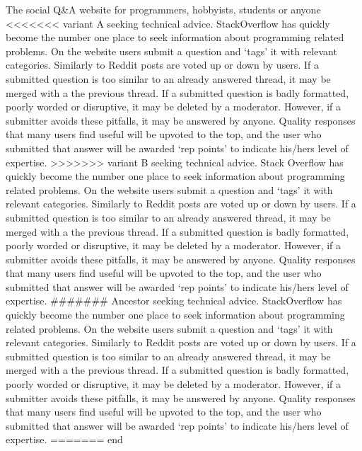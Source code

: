 \documentclass[a4paper,11pt]{article} %
\begin{document}
The social Q\&A website for programmers, hobbyists, students or anyone
<<<<<<< variant A
seeking technical advice. StackOverflow has quickly become the number one
place to seek information about programming related problems. On the website
users submit a question and ‘tags’ it with relevant categories.  Similarly
to Reddit posts are voted up or down by users. If a submitted question is
too similar to an already answered thread, it may be merged with a the
previous thread. If a submitted question is badly formatted, poorly worded
or disruptive, it may be deleted by a moderator.  However, if a submitter
avoids these pitfalls, it may be answered by anyone. Quality responses that
many users find useful will be upvoted to the top, and the user who
submitted that answer will be awarded ‘rep points’ to indicate his/hers
level of expertise.
>>>>>>> variant B
seeking technical advice. Stack Overflow has quickly become the number one
place to seek information about programming related problems. On the
website users submit a question and ‘tags’ it with relevant categories.
Similarly to Reddit posts are voted up or down by users. If a
submitted question is too similar to an already answered thread, it may be
merged with a the previous thread. If a submitted question is badly formatted,
poorly worded or disruptive, it may be deleted by a moderator.
However, if a submitter avoids these pitfalls, it may be answered by
anyone. Quality responses that many users find useful will be upvoted to the
top, and the user who submitted that answer will be awarded ‘rep points’ to
indicate his/hers level of expertise. 
####### Ancestor
seeking technical advice. StackOverflow has quickly become the number one
place to seek information about programming related problems. On the
website users submit a question and ‘tags’ it with relevant categories.
Similarly to Reddit posts are voted up or down by users. If a
submitted question is too similar to an already answered thread, it may be
merged with a the previous thread. If a submitted question is badly formatted,
poorly worded or disruptive, it may be deleted by a moderator.
However, if a submitter avoids these pitfalls, it may be answered by
anyone. Quality responses that many users find useful will be upvoted to the
top, and the user who submitted that answer will be awarded ‘rep points’ to
indicate his/hers level of expertise. 
======= end

\end{document}
